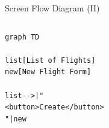 \documentclass[aspectratio=43,handout,bigger]{beamer}
\begin{document}
\begin{frame}[fragile]{Screen Flow Diagram (II)}
  \begin{columns}
    \begin{column}{.5\textwidth}
\begin{verbatim}
graph TD

list[List of Flights]
new[New Flight Form]

list-->|"
<button>Create</button>
"|new
\end{verbatim}
\end{column}
\begin{column}{.5\textwidth}
\end{column}
\end{columns}
\end{frame}

\end{document}

